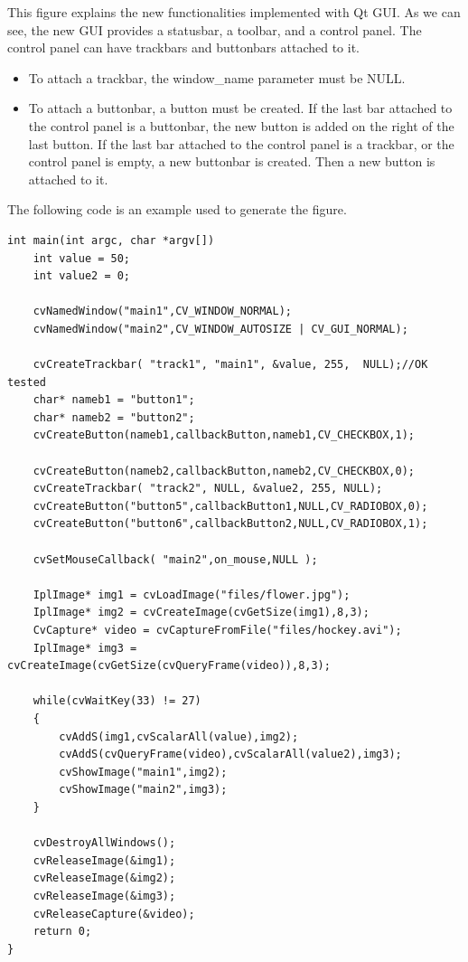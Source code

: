 This figure explains the new functionalities implemented with Qt GUI. As we can see, the new GUI provides a statusbar, a toolbar, and a control panel. The control panel can have trackbars and buttonbars attached to it.
\begin{itemize}
    \item  To attach a trackbar, the window\_name parameter must be NULL.
    \item  To attach a buttonbar, a button must be created. 
If the last bar attached to the control panel is a buttonbar, the new button is added on the right of the last button. 
If the last bar attached to the control panel is a trackbar, or the control panel is empty, a new buttonbar is created. Then a new button is attached to it.
\end{itemize}

The following code is an example used to generate the figure.
\begin{lstlisting}
int main(int argc, char *argv[])
    int value = 50;
    int value2 = 0;

    cvNamedWindow("main1",CV_WINDOW_NORMAL);
    cvNamedWindow("main2",CV_WINDOW_AUTOSIZE | CV_GUI_NORMAL);

    cvCreateTrackbar( "track1", "main1", &value, 255,  NULL);//OK tested
    char* nameb1 = "button1";
    char* nameb2 = "button2";
    cvCreateButton(nameb1,callbackButton,nameb1,CV_CHECKBOX,1);
	
    cvCreateButton(nameb2,callbackButton,nameb2,CV_CHECKBOX,0);
    cvCreateTrackbar( "track2", NULL, &value2, 255, NULL);
    cvCreateButton("button5",callbackButton1,NULL,CV_RADIOBOX,0);
    cvCreateButton("button6",callbackButton2,NULL,CV_RADIOBOX,1);

    cvSetMouseCallback( "main2",on_mouse,NULL );

    IplImage* img1 = cvLoadImage("files/flower.jpg");
    IplImage* img2 = cvCreateImage(cvGetSize(img1),8,3);
    CvCapture* video = cvCaptureFromFile("files/hockey.avi");
    IplImage* img3 = cvCreateImage(cvGetSize(cvQueryFrame(video)),8,3);

    while(cvWaitKey(33) != 27)
    {
        cvAddS(img1,cvScalarAll(value),img2);
        cvAddS(cvQueryFrame(video),cvScalarAll(value2),img3);
        cvShowImage("main1",img2);
        cvShowImage("main2",img3);
    }

    cvDestroyAllWindows();
    cvReleaseImage(&img1);
    cvReleaseImage(&img2);
    cvReleaseImage(&img3);
    cvReleaseCapture(&video);
    return 0;
}
\end{lstlisting}


